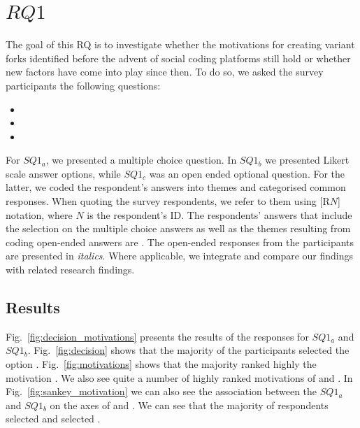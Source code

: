 \section{$RQ1$}
\label{sec:results-RQ1}
\textbf{\RQOne} The goal of this RQ is to investigate whether the motivations for creating variant forks identified before the advent of social coding platforms still hold or whether new factors have come into play since then. To do so, we asked the survey participants the following questions:

\begin{itemize}
\item \rqOneOne
\item \rqOneTwo
\item \rqOneThree
\end{itemize}



For $SQ1_{a}$, we presented a multiple choice question. In $SQ1_{b}$ we presented Likert scale answer options, while $SQ1_{c}$ was an open ended optional question. For the latter, we coded the respondent's answers into themes and categorised common responses.
When quoting the survey respondents, we refer to them using [R$N$] notation, where $N$ is the respondent's ID.
The respondents' answers that include the selection on the multiple choice answers as well as the themes resulting from coding open-ended answers are . The
open-ended responses from the participants are presented in \emph{italics}. 
Where applicable, we integrate and compare our findings with related research findings.

\subsection{Results}
Fig.~\ref{fig:decision_motivations} presents the results of the responses for $SQ1_{a}$ and $SQ1_{b}$. Fig.~\ref{fig:decision} shows that the majority of the participants selected the option . Fig.~\ref{fig:motivations} shows that the majority ranked highly the motivation . We also see quite a number of highly ranked motivations of  and . In Fig.~\ref{fig:sankey_motivation} we can also see the association between the $SQ1_{a}$ and $SQ1_{b}$ on the axes of  and . We can see that the majority of respondents selected  and selected .

